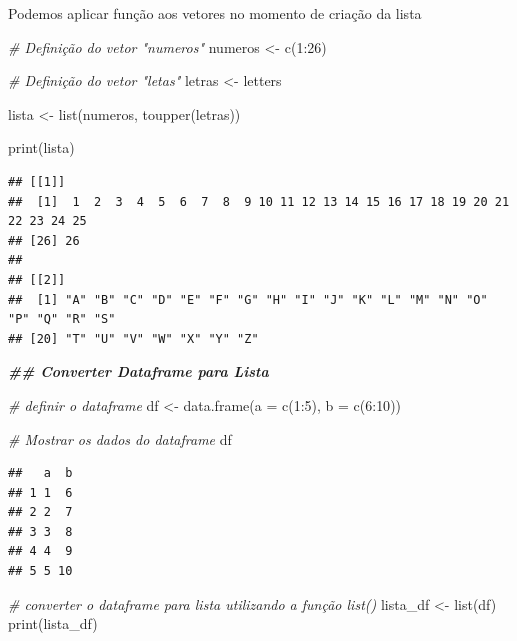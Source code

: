 \documentclass[
]{article}
\newenvironment{Shaded}{\begin{snugshade}}{\end{snugshade}}
\newcommand{\AttributeTok}[1]{\textcolor[rgb]{0.77,0.63,0.00}{#1}}
\newcommand{\CommentTok}[1]{\textcolor[rgb]{0.56,0.35,0.01}{\textit{#1}}}
\newcommand{\DecValTok}[1]{\textcolor[rgb]{0.00,0.00,0.81}{#1}}
\newcommand{\DocumentationTok}[1]{\textcolor[rgb]{0.56,0.35,0.01}{\textbf{\textit{#1}}}}
\newcommand{\FunctionTok}[1]{\textcolor[rgb]{0.00,0.00,0.00}{#1}}
\newcommand{\NormalTok}[1]{#1}
\newcommand{\OtherTok}[1]{\textcolor[rgb]{0.56,0.35,0.01}{#1}}
\newcommand{\SpecialCharTok}[1]{\textcolor[rgb]{0.00,0.00,0.00}{#1}}
\begin{document}
Podemos aplicar função aos vetores no momento de criação da lista

\begin{Shaded}
\begin{Highlighting}[]
\CommentTok{\# Definição do vetor "numeros"}
\NormalTok{numeros }\OtherTok{\textless{}{-}} \FunctionTok{c}\NormalTok{(}\DecValTok{1}\SpecialCharTok{:}\DecValTok{26}\NormalTok{)}

\CommentTok{\# Definição do vetor "letas"}
\NormalTok{letras }\OtherTok{\textless{}{-}}\NormalTok{ letters}

\NormalTok{lista }\OtherTok{\textless{}{-}} \FunctionTok{list}\NormalTok{(numeros, }\FunctionTok{toupper}\NormalTok{(letras))}

\FunctionTok{print}\NormalTok{(lista)}
\end{Highlighting}
\end{Shaded}

\begin{verbatim}
## [[1]]
##  [1]  1  2  3  4  5  6  7  8  9 10 11 12 13 14 15 16 17 18 19 20 21 22 23 24 25
## [26] 26
## 
## [[2]]
##  [1] "A" "B" "C" "D" "E" "F" "G" "H" "I" "J" "K" "L" "M" "N" "O" "P" "Q" "R" "S"
## [20] "T" "U" "V" "W" "X" "Y" "Z"
\end{verbatim}

\begin{Shaded}
\begin{Highlighting}[]
\DocumentationTok{\#\# Converter Dataframe para Lista}

\CommentTok{\# definir o dataframe }
\NormalTok{df }\OtherTok{\textless{}{-}} \FunctionTok{data.frame}\NormalTok{(}\AttributeTok{a =} \FunctionTok{c}\NormalTok{(}\DecValTok{1}\SpecialCharTok{:}\DecValTok{5}\NormalTok{), }\AttributeTok{b =} \FunctionTok{c}\NormalTok{(}\DecValTok{6}\SpecialCharTok{:}\DecValTok{10}\NormalTok{))}

\CommentTok{\# Mostrar os dados do dataframe}
\NormalTok{df}
\end{Highlighting}
\end{Shaded}

\begin{verbatim}
##   a  b
## 1 1  6
## 2 2  7
## 3 3  8
## 4 4  9
## 5 5 10
\end{verbatim}

\begin{Shaded}
\begin{Highlighting}[]
\CommentTok{\# converter o dataframe para lista utilizando a função list()}
\NormalTok{lista\_df }\OtherTok{\textless{}{-}} \FunctionTok{list}\NormalTok{(df)}
\FunctionTok{print}\NormalTok{(lista\_df)}
\end{Highlighting}
\end{Shaded}
\end{document}
